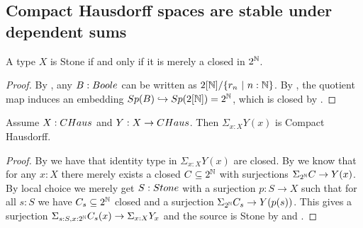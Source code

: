 \subsection{Compact Hausdorff spaces are stable under dependent sums}

\begin{lemma}\label{StoneAsClosedSubsetOfCantor}
A type $X$ is Stone if and only if it is merely a closed in $2^{\mathbb{N}}$.
\end{lemma}
\begin{proof}
  By , any $B:\Boole$ can be written as $2[\N]/\{r_n\ |\ n:\N\}$.
  By , the quotient map induces an embedding $Sp(B)\hookrightarrow Sp(2[\mathbb{N}])= 2^{\mathbb{N}}$, 
  which is closed by .
\end{proof}


\begin{lemma}\label{SigmaCompactHausdorff}
Assume $X:\CHaus$ and $Y:X\to \CHaus$. Then $\Sigma_{x:X}Y(x)$ is Compact Hausdorff.
\end{lemma}

\begin{proof}
By  we have that identity type in $\Sigma_{x:X}Y(x)$ are closed. By  we know that for any $x:X$ there merely exists a closed $C\subseteq 2^{\mathbb{N}}$ with surjections $\Sigma_{2^{\mathbb{N}}}C \to Y(x)$. By local choice we merely get $S:\Stone$ with a surjection $p:S\to X$ such that for all $s:S$ we have $C_s\subseteq 2^{\mathbb{N}}$ closed and a surjection $\Sigma_{2^{\mathbb{N}}}C_s\to Y(p(s))$. This gives a surjection $\Sigma_{s:S,x:2^{\mathbb{N}}}C_s(x)\to\Sigma_{x:X}Y_x$ and the source is Stone by  and .
\end{proof}
